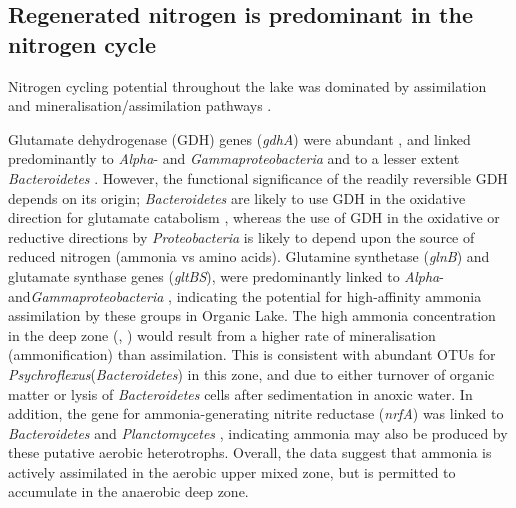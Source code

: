 \subsection{Regenerated nitrogen is predominant in the nitrogen cycle}
Nitrogen cycling potential throughout the lake was dominated by assimilation and mineralisation/assimilation pathways . 
 
Glutamate dehydrogenase (GDH) genes (\emph{gdhA}) were abundant , and linked predominantly to \emph{Alpha}- and \emph{Gammaproteobacteria} and to a lesser extent \emph{Bacteroidetes} . 
However, the functional significance of the readily reversible GDH depends on its origin; \emph{Bacteroidetes} are likely to use GDH in the oxidative direction for glutamate catabolism \cite{Williams2012}, whereas the use of GDH in the oxidative or reductive directions by \emph{Proteobacteria} is likely to depend upon the source of reduced nitrogen (ammonia vs amino acids). 
Glutamine synthetase (\emph{glnB}) and glutamate synthase genes (\emph{gltBS}), were predominantly linked to \emph{Alpha}- and\emph{Gammaproteobacteria} , indicating the potential for high-affinity ammonia assimilation by these groups in Organic Lake. 
The high ammonia concentration in the deep zone (, ) would result from a higher rate of mineralisation (ammonification) than assimilation. 
This is consistent with abundant \acp{OTU} for \emph{Psychroflexus}(\emph{Bacteroidetes}) in this zone, and due to either turnover of organic matter or lysis of \emph{Bacteroidetes} cells after sedimentation in anoxic water. 
In addition, the gene for ammonia-generating nitrite reductase (\emph{nrfA}) was linked to \emph{Bacteroidetes} and \emph{Planctomycetes} , indicating ammonia may also be produced by these putative aerobic heterotrophs. 
Overall, the data suggest that ammonia is actively assimilated in the aerobic upper mixed zone, but is permitted to accumulate in the anaerobic deep zone.



